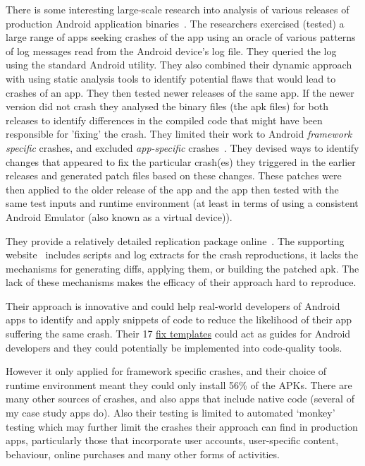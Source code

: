 There is some interesting large-scale research into analysis of various releases of production Android application binaries~. The researchers exercised (tested) a large range of apps seeking crashes of the app using an oracle of various patterns of log messages read from the Android device's log file. They queried the log using the standard Android  utility. They also combined their dynamic approach with using static analysis tools to identify potential flaws that would lead to crashes of an app. They then tested newer releases of the same app. If the newer version did not crash they analysed the binary files (the \Gls{apk} 
files) for both releases to identify differences in the compiled code that might have been responsible for 'fixing' the crash. They limited their work to Android \emph{framework specific} crashes, and excluded \emph{app-specific} crashes~. They devised ways to identify changes that appeared to fix the particular crash(es) they triggered in the earlier releases and generated patch files based on these changes. These patches were then applied to the older release of the app and the app then tested with the same test inputs and runtime environment (at least in terms of using a consistent Android Emulator (also known as a virtual device)). 

They provide a relatively detailed replication package online~. The supporting website~ includes scripts and log extracts for the crash reproductions, it lacks the mechanisms for generating diffs, applying them, or building the patched \Gls{apk}. The lack of these mechanisms makes the efficacy of their approach hard to reproduce.

Their approach is innovative and could help real-world developers of Android apps to identify and apply snippets of code to reduce the likelihood of their app suffering the same crash. Their 17 \href{https://github.com/CraftDroid/ExpData/tree/master/Fix_Templates}{fix templates} could act as guides for Android developers and they could potentially be implemented into code-quality tools.
    
However it only applied for framework specific crashes, and their choice of runtime environment meant they could only install 56\% of the APKs. There are many other sources of crashes, and also apps that include native code (several of my case study apps do). Also their testing is limited to automated `monkey' testing which may further limit the crashes their approach can find in production apps, particularly those that incorporate user accounts, user-specific content, behaviour, online purchases and many other forms of activities.

